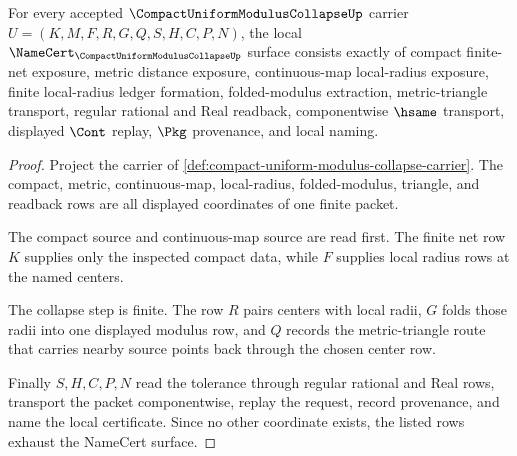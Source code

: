 \begin{theorem}
\label{thm:compact-uniform-modulus-collapse-namecert-obligations}
For every accepted $\CompactUniformModulusCollapseUp$ carrier $U=(K,M,F,R,G,Q,S,H,C,P,N)$, the local $\NameCert_{\CompactUniformModulusCollapseUp}$ surface consists exactly of compact finite-net exposure, metric distance exposure, continuous-map local-radius exposure, finite local-radius ledger formation, folded-modulus extraction, metric-triangle transport, regular rational and Real readback, componentwise $\hsame$ transport, displayed $\Cont$ replay, $\Pkg$ provenance, and local naming.
\end{theorem}
\begin{proof}
Project the carrier of \autoref{def:compact-uniform-modulus-collapse-carrier}. The compact, metric, continuous-map, local-radius, folded-modulus, triangle, and readback rows are all displayed coordinates of one finite packet.

The compact source and continuous-map source are read first. The finite net row $K$ supplies only the inspected compact data, while $F$ supplies local radius rows at the named centers.

The collapse step is finite. The row $R$ pairs centers with local radii, $G$ folds those radii into one displayed modulus row, and $Q$ records the metric-triangle route that carries nearby source points back through the chosen center row.

Finally $S,H,C,P,N$ read the tolerance through regular rational and Real rows, transport the packet componentwise, replay the request, record provenance, and name the local certificate. Since no other coordinate exists, the listed rows exhaust the NameCert surface.
\end{proof}

